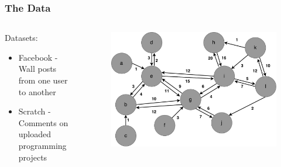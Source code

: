 \begin{frame}
\frametitle{The Data}
\begin{columns}
	\begin{column}{0.45\textwidth}
		Datasets:
			\begin{itemize}
				\item Facebook - Wall posts from one user to another
				\item Scratch - Comments on uploaded programming projects 
			\end{itemize}
		\end{column}
		\begin{column}{0.55\textwidth}
			\begin{figure}
				\includegraphics[scale=0.24]{graphics/directed_network.pdf}
			\end{figure}
		\end{column}
	\end{columns}
\end{frame}

